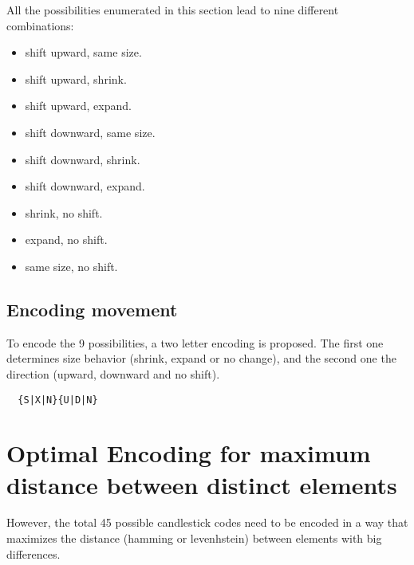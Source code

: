 \documentclass[]{article}
\begin{document}
All the possibilities enumerated in this section lead to nine different combinations:

\begin{itemize}
	\item shift upward, same size.
	\item shift upward, shrink.
	\item shift upward, expand.
	\item shift downward, same size.
	\item shift downward, shrink.
	\item shift downward, expand.
	\item shrink, no shift.
	\item expand, no shift.
	\item same size, no shift.
\end{itemize}

\subsection{Encoding movement}

To encode the 9 possibilities, a two letter encoding is proposed. The first one determines size behavior (shrink, expand or no change), and the second one the direction (upward, downward and no shift).

\begin{verbatim}
  {S|X|N}{U|D|N}
\end{verbatim}

\section{Optimal Encoding for maximum distance between distinct elements}

However, the total 45 possible candlestick codes need to be encoded in a way that maximizes the distance (hamming or levenhstein) between elements with big differences.
\end{document}
